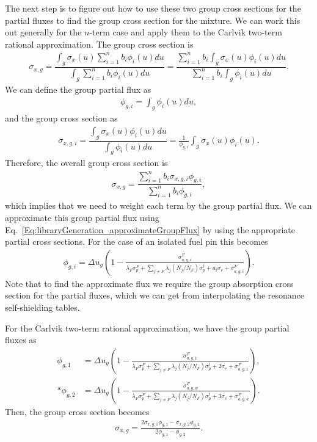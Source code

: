 The next step is to figure out how to use these two group cross sections for the partial fluxes to find the group cross section for the mixture. We can work this out generally for the $n$-term case and apply them to the Carlvik two-term rational approximation. The group cross section is
\begin{align}
  \sigma_{x,g} = \dfrac{ \displaystyle\int_g \sigma_x(u) \sum_{i=1}^n b_i \phi_i(u) du }{ \displaystyle\int_g \sum_{i=1}^n b_i \phi_i(u) du } 
  =  \dfrac{ \displaystyle\sum_{i=1}^n b_i  \displaystyle\int_g \sigma_x(u) \phi_i(u) du }{ \displaystyle\sum_{i=1}^n b_i \displaystyle\int_g  \phi_i(u) du } .
\end{align}
We can define the group partial flux as
\begin{align}
  \phi_{g,i} = \displaystyle\int_g  \phi_i(u) du ,
\end{align}
and the group cross section as
\begin{align}
  \sigma_{x,g,i} = \dfrac{ \displaystyle\int_g \sigma_x(u) \phi_i(u) du }{  \displaystyle\int_g  \phi_i(u) du } = \frac{1}{\phi_{g,i}}  \displaystyle\int_g \sigma_x(u) \phi_i(u) .
\end{align}
Therefore, the overall group cross section is
\begin{align}
  \sigma_{x,g}  =  \dfrac{ \displaystyle\sum_{i=1}^n b_i  \sigma_{x,g,i} \phi_{g,i} }{ \displaystyle\sum_{i=1}^n b_i \phi_{g,i} } ,
\end{align}
which implies that we need to weight each term by the group partial flux. We can approximate this group partial flux using Eq.~\eqref{Eq:libraryGeneration_approximateGroupFlux} by using the appropriate partial cross sections. For the case of an isolated fuel pin this becomes
\begin{align}
  \phi_{g,i} = \Delta u_g \left( 1 - \frac{ \sigma_{a,g,i}^F }{  \lambda_F \sigma_p^F + \displaystyle\sum_{j \ne F} \lambda_j ( N_j / N_F ) \sigma_p^j + a_i \sigma_e + \sigma_{a,g,i}^F } \right) . 
\end{align}
Note that to find the approximate flux we require the group absorption cross section for the partial fluxes, which we can get from interpolating the resonance self-shielding tables.

For the Carlvik two-term rational approximation, we have the group partial fluxes as
\begin{subequations}
\begin{align}
  \phi_{g,1} &= \Delta u_g \left( 1 - \frac{ \sigma_{a,g,1}^F }{  \lambda_F \sigma_p^F + \displaystyle\sum_{j \ne F} \lambda_j ( N_j / N_F ) \sigma_p^j + 2 \sigma_e + \sigma_{a,g,1}^F } \right) , \\*
  \phi_{g,2} &= \Delta u_g \left( 1 - \frac{ \sigma_{a,g,w}^F }{  \lambda_F \sigma_p^F + \displaystyle\sum_{j \ne F} \lambda_j ( N_j / N_F ) \sigma_p^j + 3 \sigma_e + \sigma_{a,g,w}^F } \right) .
\end{align}
\end{subequations}
Then, the group cross section becomes
\begin{align}
  \sigma_{x,g} = \frac{ 2 \sigma_{x,g,1} \phi_{g,1} - \sigma_{x,g,2} \phi_{g,2} }{ 2 \phi_{g,1} - \phi_{g,2} } .
\end{align}




